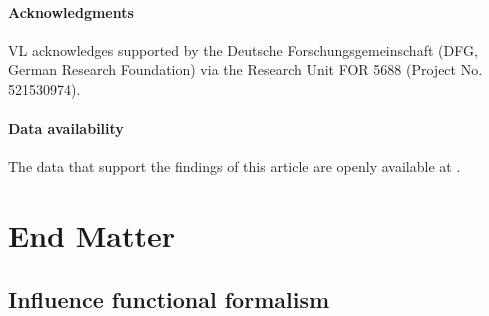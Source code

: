 \documentclass[aps,prb, twocolumn,superscriptaddress]{revtex4-2}
\begin{document}
\paragraph*{Acknowledgments} VL acknowledges supported by the Deutsche Forschungsgemeinschaft (DFG, German Research Foundation) via the Research Unit FOR 5688 (Project No. 521530974).

\paragraph*{Data availability} The data that support the findings of this article are openly available at \cite{mickiewicz2026data}.




\clearpage
\section*{End Matter} \label{end_matter}


\subsection{Influence functional formalism}
\end{document}
